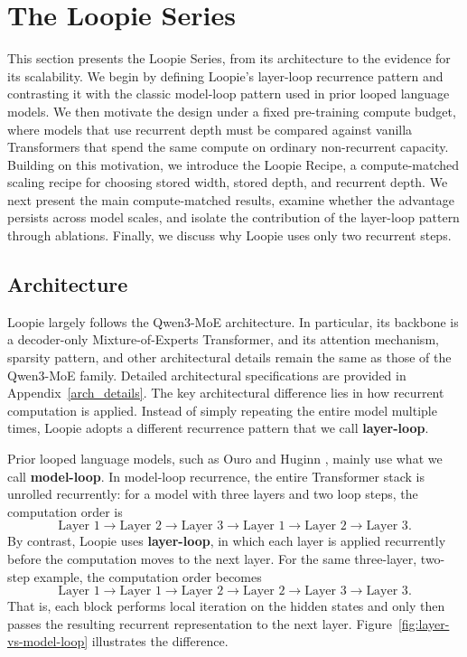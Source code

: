 \newpage



\section{The Loopie Series}

This section presents the Loopie Series, from its architecture to the evidence for its scalability. We begin by defining Loopie's layer-loop recurrence pattern and contrasting it with the classic model-loop pattern used in prior looped language models. We then motivate the design under a fixed pre-training compute budget, where models that use recurrent depth must be compared against vanilla Transformers that spend the same compute on ordinary non-recurrent capacity. Building on this motivation, we introduce the Loopie Recipe, a compute-matched scaling recipe for choosing stored width, stored depth, and recurrent depth. We next present the main compute-matched results, examine whether the advantage persists across model scales, and isolate the contribution of the layer-loop pattern through ablations. Finally, we discuss why Loopie uses only two recurrent steps.

\subsection{Architecture}
\label{subsec:architecture}

Loopie largely follows the Qwen3-MoE architecture. In particular, its backbone is a decoder-only Mixture-of-Experts Transformer, and its attention mechanism, sparsity pattern, and other architectural details remain the same as those of the Qwen3-MoE family. Detailed architectural specifications are provided in Appendix~\ref{arch_details}. The key architectural difference lies in how recurrent computation is applied. Instead of simply repeating the entire model multiple times, Loopie adopts a different recurrence pattern that we call \textbf{layer-loop}.

Prior looped language models, such as Ouro and Huginn \citep{zhu2025scalinglatent,geiping2025scalinglatent}, mainly use what we call \textbf{model-loop}. In model-loop recurrence, the entire Transformer stack is unrolled recurrently: for a model with three layers and two loop steps, the computation order is
\[
\text{Layer 1} \rightarrow \text{Layer 2} \rightarrow \text{Layer 3}
\rightarrow \text{Layer 1} \rightarrow \text{Layer 2} \rightarrow \text{Layer 3}.
\]
By contrast, Loopie uses \textbf{layer-loop}, in which each layer is applied recurrently before the computation moves to the next layer. For the same three-layer, two-step example, the computation order becomes
\[
\text{Layer 1} \rightarrow \text{Layer 1} \rightarrow
\text{Layer 2} \rightarrow \text{Layer 2} \rightarrow
\text{Layer 3} \rightarrow \text{Layer 3}.
\]
That is, each block performs local iteration on the hidden states and only then passes the resulting recurrent representation to the next layer. Figure~\ref{fig:layer-vs-model-loop} illustrates the difference.

